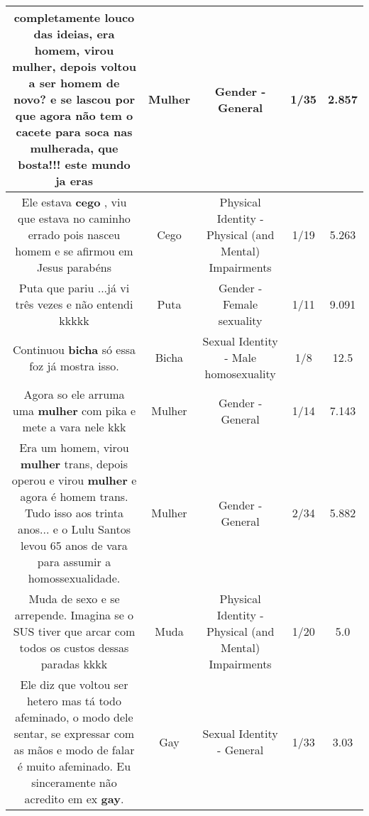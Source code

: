\documentclass[11pt]{article}
\newlength\mylength
\begin{document}
\begin{center}
\begin{longtable}{|C{.65\mylength}|C{.30\mylength}|C{.12\mylength}|C{.12\mylength}|C{.12\mylength}|}
  \small completamente louco das ideias, era homem, virou \textbf{mulher}, depois voltou a ser homem de novo? e se lascou por que agora não tem o cacete para soca nas mulherada, que bosta!!! este mundo ja eras\normalsize   & Mulher & Gender - General & 1/35 & 2.857 \\  \hline
  \small Ele estava \textbf{cego} , viu que estava no caminho errado pois nasceu homem e se afirmou em Jesus parabéns\normalsize   & Cego & Physical Identity - Physical (and Mental) Impairments & 1/19 & 5.263 \\  \hline
  \small Puta que pariu ...já vi três vezes e não entendi kkkkk\normalsize   & Puta & Gender - Female sexuality & 1/11 & 9.091 \\  \hline
  \small Continuou \textbf{bicha} só essa foz já mostra isso.\normalsize   & Bicha & Sexual Identity - Male homosexuality & 1/8 & 12.5 \\  \hline
  \small Agora so ele arruma uma \textbf{mulher} com pika e mete a vara nele kkk\normalsize   & Mulher & Gender - General & 1/14 & 7.143 \\  \hline
  \small Era um homem, virou \textbf{mulher} trans, depois operou e virou \textbf{mulher} e agora é homem trans. Tudo isso aos trinta anos... e o Lulu Santos levou 65 anos de vara para assumir a homossexualidade.\normalsize   & Mulher & Gender - General & 2/34 & 5.882 \\  \hline
  \small Muda de sexo e se arrepende. Imagina se o SUS tiver que arcar com todos os custos dessas paradas kkkk\normalsize   & Muda & Physical Identity - Physical (and Mental) Impairments & 1/20 & 5.0 \\  \hline
  \small Ele diz que voltou ser hetero mas tá todo afeminado, o modo dele sentar, se expressar com as mãos e modo de falar é muito afeminado. Eu sinceramente não acredito em ex \textbf{gay}.\normalsize   & Gay & Sexual Identity - General & 1/33 & 3.03 \\  \hline

\end{longtable}
\end{center}
\end{document}
